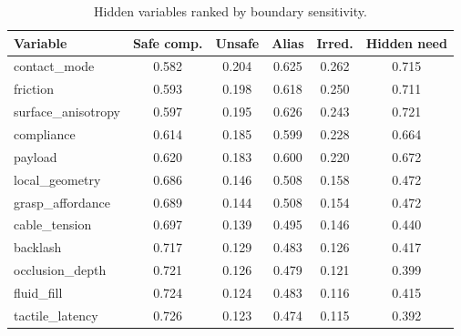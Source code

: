 \begin{table}[t]
\centering
\caption{Hidden variables ranked by boundary sensitivity.}
\label{tab:hidden-summary}
\small
\begin{tabular}{lccccc}
\toprule
Variable & Safe comp. & Unsafe & Alias & Irred. & Hidden need \\
\midrule
contact\_mode & 0.582 & 0.204 & 0.625 & 0.262 & 0.715 \\
friction & 0.593 & 0.198 & 0.618 & 0.250 & 0.711 \\
surface\_anisotropy & 0.597 & 0.195 & 0.626 & 0.243 & 0.721 \\
compliance & 0.614 & 0.185 & 0.599 & 0.228 & 0.664 \\
payload & 0.620 & 0.183 & 0.600 & 0.220 & 0.672 \\
local\_geometry & 0.686 & 0.146 & 0.508 & 0.158 & 0.472 \\
grasp\_affordance & 0.689 & 0.144 & 0.508 & 0.154 & 0.472 \\
cable\_tension & 0.697 & 0.139 & 0.495 & 0.146 & 0.440 \\
backlash & 0.717 & 0.129 & 0.483 & 0.126 & 0.417 \\
occlusion\_depth & 0.721 & 0.126 & 0.479 & 0.121 & 0.399 \\
fluid\_fill & 0.724 & 0.124 & 0.483 & 0.116 & 0.415 \\
tactile\_latency & 0.726 & 0.123 & 0.474 & 0.115 & 0.392 \\
\bottomrule
\end{tabular}
\end{table}

